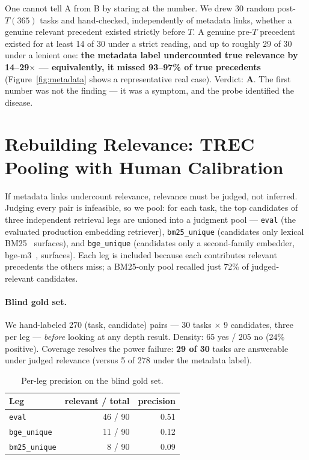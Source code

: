 \documentclass[sigconf,nonacm]{acmart}
\begin{document}
One cannot tell A from B by staring at the number. We drew 30 random
post-$T(365)$ tasks and hand-checked, independently of metadata links,
whether a genuine relevant precedent existed strictly before $T$. A
genuine pre-$T$ precedent existed for at least 14 of 30 under a strict
reading, and up to roughly 29 of 30 under a lenient one: \textbf{the
metadata label undercounted true relevance by 14--29$\times$ ---
equivalently, it missed 93--97\% of true precedents}
(Figure~\ref{fig:metadata} shows a representative real case). Verdict:
\textbf{A}. The first number was not the finding --- it was a symptom, and
the probe identified the disease.

\section{Rebuilding Relevance: TREC Pooling with Human Calibration}
\label{sec:pooling}

If metadata links undercount relevance, relevance must be judged, not
inferred. Judging every pair is infeasible, so we pool: for each task, the
top candidates of three independent retrieval legs are unioned into a
judgment pool --- \texttt{eval} (the evaluated production embedding
retriever), \texttt{bm25\_unique} (candidates only lexical
BM25~\cite{robertson2009bm25} surfaces), and \texttt{bge\_unique}
(candidates only a second-family embedder, bge-m3~\cite{chen2024bge},
surfaces). Each leg is included because each contributes relevant
precedents the others miss; a BM25-only pool recalled just 72\% of
judged-relevant candidates.

\paragraph{Blind gold set.}
We hand-labeled 270 (task, candidate) pairs --- 30 tasks $\times$ 9
candidates, three per leg --- \emph{before} looking at any depth result.
Density: 65 yes / 205 no (24\% positive). Coverage resolves the power
failure: \textbf{29 of 30} tasks are answerable under judged relevance
(versus 5 of 278 under the metadata label).

\begin{table}[h]
  \caption{Per-leg precision on the blind gold set.}
  \label{tab:legs}
  \begin{tabular}{lrr}
    \toprule
    Leg & relevant / total & precision \\
    \midrule
    \texttt{eval} & 46 / 90 & 0.51 \\
    \texttt{bge\_unique} & 11 / 90 & 0.12 \\
    \texttt{bm25\_unique} & 8 / 90 & 0.09 \\
    \bottomrule
  \end{tabular}
\end{table}
\end{document}
